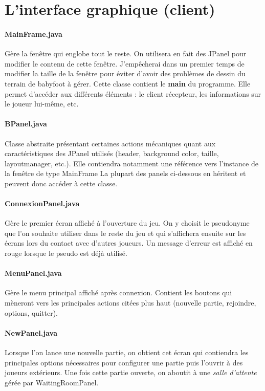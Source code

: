 \documentclass[a4paper,12pt]{report}
\begin{document}
\section{L'interface graphique (client)}
\paragraph{MainFrame.java}
Gère la fenêtre qui englobe tout le reste. On utilisera en fait des JPanel pour modifier le contenu de cette fenêtre. J'empêcherai dans un premier temps de modifier la taille de la fenêtre pour éviter d'avoir des problèmes de dessin du terrain de babyfoot à gérer. Cette classe contient le \textbf{main} du programme. Elle permet d'accéder aux différents éléments : le client récepteur, les informations sur le joueur lui-même, etc.
\paragraph{BPanel.java}
Classe abstraite présentant certaines actions mécaniques quant aux caractéristiques des JPanel utilisés (header, background color, taille, layoutmanager, etc.). Elle contiendra notamment une référence vers l'instance de la fenêtre de type MainFrame La plupart des panels ci-dessous en héritent et peuvent donc accéder à cette classe.
\paragraph{ConnexionPanel.java}
Gère le premier écran affiché à l'ouverture du jeu. On y choisit le pseudonyme que l'on souhaite utiliser dans le reste du jeu et qui s'affichera ensuite sur les écrans lors du contact avec d'autres joueurs. Un message d'erreur est affiché en rouge lorsque le pseudo est déjà utilisé.
\paragraph{MenuPanel.java}
Gère le menu principal affiché après connexion. Contient les boutons qui mèneront vers les principales actions citées plus haut (nouvelle partie, rejoindre, options, quitter).
\paragraph{NewPanel.java}
Lorsque l'on lance une nouvelle partie, on obtient cet écran qui contiendra les principales options nécessaires pour configurer une partie puis l'ouvrir à des joueurs extérieurs. Une fois cette partie ouverte, on aboutit à une \emph{salle d'attente} gérée par WaitingRoomPanel.
\end{document}
